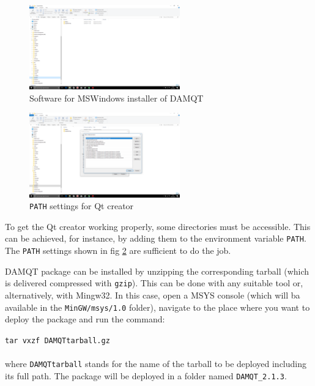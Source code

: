 \documentclass[a4paper,10pt]{article}
\begin{document}
\begin{minipage}{0.5\linewidth}
\begin{figure}[H]
\begin{center}
\includegraphics[width=6.5cm]{fig1.png}
\vspace*{1mm}
\caption{\small Software for MSWindows installer of DAMQT \label{fig:1}}
\end{center}
\end{figure}
\end{minipage}
\begin{minipage}{0.5\linewidth}
\begin{figure}[H]
\begin{center}
\vspace*{-4mm}
\includegraphics[width=6.5cm]{fig2.png}
\caption{\small \texttt{PATH} settings for Qt creator \label{fig:2}}
\end{center}
\end{figure}
\end{minipage}

To get the Qt creator working properly, some directories must be accessible.
This can be achieved, for instance, by adding them to the environment variable \texttt{PATH}.
The \texttt{PATH} settings shown in fig \ref{fig:2} are sufficient to do the job. 


%
DAMQT package can be installed by unzipping the corresponding tarball (which is delivered compressed with \texttt{gzip}).
This can be done with any suitable tool or, alternatively, with Mingw32. In this case, open
a MSYS console (which will ba available in the \texttt{MinGW/msys/1.0} folder),
navigate to the place where you want to deploy the package and run the command:

\texttt{tar vxzf DAMQTtarball.gz} \\ \\
%
where \texttt{DAMQTtarball} stands for the name of the tarball to be deployed including its full path.
The package will be deployed in a folder named \texttt{DAMQT\_2.1.3}.
\end{document}
